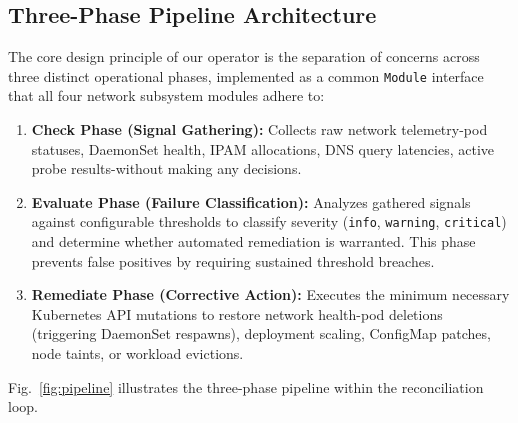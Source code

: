 \documentclass[conference]{IEEEtran}
\begin{document}
\subsection{Three-Phase Pipeline Architecture}

The core design principle of our operator is the separation of concerns across three distinct operational phases, implemented as a common \texttt{Module} interface that all four network subsystem modules adhere to:

\begin{enumerate}
  \item \textbf{Check Phase (Signal Gathering):} Collects raw network telemetry-pod statuses, DaemonSet health, IPAM allocations, DNS query latencies, active probe results-without making any decisions.
  \item \textbf{Evaluate Phase (Failure Classification):} Analyzes gathered signals against configurable thresholds to classify severity (\texttt{info}, \texttt{warning}, \texttt{critical}) and determine whether automated remediation is warranted. This phase prevents false positives by requiring sustained threshold breaches.
  \item \textbf{Remediate Phase (Corrective Action):} Executes the minimum necessary Kubernetes API mutations to restore network health-pod deletions (triggering DaemonSet respawns), deployment scaling, ConfigMap patches, node taints, or workload evictions.
\end{enumerate}

Fig.~\ref{fig:pipeline} illustrates the three-phase pipeline within the reconciliation loop.
\end{document}
